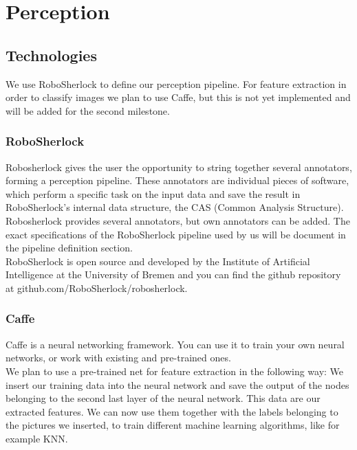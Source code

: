 \documentclass[main.tex]{subfiles}
\begin{document}
	
	\chapter{Perception}
 	
 	\section{Technologies}
 	We use RoboSherlock to define our perception pipeline. For feature extraction in order to classify images we plan to use Caffe, but this is not yet implemented 
 	and will be added for the second milestone.
 	
 	\subsection{RoboSherlock}
	Robosherlock gives the user the opportunity to string together several annotators, forming a perception pipeline. These annotators are individual pieces of
	software, which perform a specific task on the input data and save the result in RoboSherlock's internal data structure, the CAS (Common Analysis Structure).
	Robosherlock provides several annotators, but own annotators can be added. The exact specifications of the RoboSherlock pipeline used by us will be document in
	the pipeline definition section.\\
	
	RoboSherlock is open source and developed by the Institute of Artificial Intelligence at the University of Bremen and you can find the github repository at 			github.com/RoboSherlock/robosherlock.
 	
 	\subsection{Caffe}
 	Caffe is a neural networking framework. You can use it to train your own neural networks, or work with existing and pre-trained ones.\\
 	
 	We plan to use a pre-trained net for feature extraction in the following way: We insert our training data into the neural network and save the output of the 			nodes belonging to the second last layer of the neural network. This data are our extracted features. We can now use them together with the labels belonging to 	the pictures we inserted, to train different machine learning algorithms, like for example KNN.\\
 	
\end{document}
